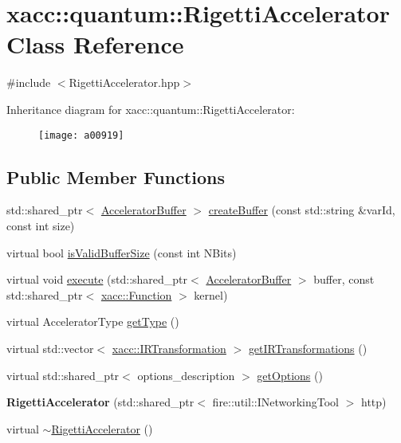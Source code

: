 \hypertarget{a00919}{}\section{xacc\+:\+:quantum\+:\+:Rigetti\+Accelerator Class Reference}
\label{a00919}


{\ttfamily \#include $<$Rigetti\+Accelerator.\+hpp$>$}

Inheritance diagram for xacc\+:\+:quantum\+:\+:Rigetti\+Accelerator\+:\begin{figure}[H]
\begin{center}
\leavevmode
\texttt{[image: a00919]}
\end{center}
\end{figure}
\subsection*{Public Member Functions}
\begin{DoxyCompactItemize}
\item 
std\+::shared\+\_\+ptr$<$ \hyperlink{a01099}{Accelerator\+Buffer} $>$ \hyperlink{a00919_a731551c94b1abef40d2cf032e8712df6}{create\+Buffer} (const std\+::string \&var\+Id, const int size)
\item 
virtual bool \hyperlink{a00919_a61352c07062597aad2393fbeed4cc025}{is\+Valid\+Buffer\+Size} (const int N\+Bits)
\item 
virtual void \hyperlink{a00919_afce7bbd1b0f04300a9920952e9d12ef4}{execute} (std\+::shared\+\_\+ptr$<$ \hyperlink{a01099}{Accelerator\+Buffer} $>$ buffer, const std\+::shared\+\_\+ptr$<$ \hyperlink{a01127}{xacc\+::\+Function} $>$ kernel)
\item 
virtual Accelerator\+Type \hyperlink{a00919_aab0d4674da5273d55407b9ab77cde890}{get\+Type} ()
\item 
virtual std\+::vector$<$ \hyperlink{a01155}{xacc\+::\+I\+R\+Transformation} $>$ \hyperlink{a00919_a443683a1dfb000603c640b2ee303cf66}{get\+I\+R\+Transformations} ()
\item 
virtual std\+::shared\+\_\+ptr$<$ options\+\_\+description $>$ \hyperlink{a00919_a9ee9e62aecbccf193894ca3388676f9f}{get\+Options} ()
\item 
\mbox{\label{a00919_aa92ba39441ec9c261fbddee23a84d6ac}} 
{\bfseries Rigetti\+Accelerator} (std\+::shared\+\_\+ptr$<$ fire\+::util\+::\+I\+Networking\+Tool $>$ http)
\item 
virtual \hyperlink{a00919_a7c86895d1c29afa8b7e18476144a3fcf}{$\sim$\+Rigetti\+Accelerator} ()
\end{DoxyCompactItemize}
